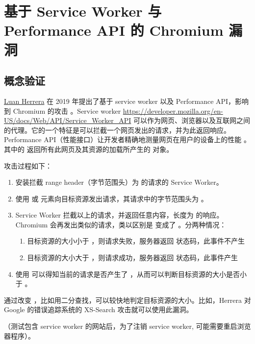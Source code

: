 \section{基于 Service Worker 与 Performance API 的 Chromium 漏洞}

\subsection{概念验证}

\href{https://blog.lbherrera.me/}{Luan Herrera} 在 2019 年提出了基于 service worker 以及 Performance API，影响到 Chromium 的攻击 \cite{herrera}。Service worker \url{https://developer.mozilla.org/en-US/docs/Web/API/Service_Worker_API} 可以作为网页、浏览器以及互联网之间的代理。它的一个特征是可以拦截一个网页发出的请求，并为此返回响应。Performance API（性能接口）让开发者精确地测量网页在用户的设备上的性能 \cite{papi}。其中的  返回所有此网页及其资源的加载所产生的  对象。

攻击过程如下：

\begin{enumerate}
    \item 安装拦截 range header（字节范围头）为  的请求的 Service Worker。
    \item 使用  或  元素向目标资源发出请求，其请求中的字节范围头为 。
    \item Service Worker 拦截以上的请求，并返回任意内容，长度为  的响应。Chromium 会再发出类似的请求，类以区别是  变成了 。分两种情况：
    \begin{enumerate}
        \item 目标资源的大小小于 ，则请求失败，服务器返回  状态码，此事件不产生 
        \item 目标资源的大小大于 ，则请求成功，服务器返回  状态码，此事件产生 
    \end{enumerate}
    \item 使用  可以得知当前的请求是否产生了 ，从而可以判断目标资源的大小是否小于 。
\end{enumerate}

通过改变 ，比如用二分查找，可以较快地判定目标资源的大小。比如，Herrera 对 Google 的错误追踪系统的 XS-Search 攻击就可以使用此漏洞。

（测试包含 service worker 的网站后，为了注销 service worker, 可能需要重启浏览器程序）。

